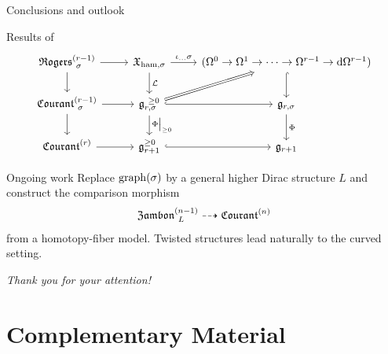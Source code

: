 \documentclass[handout,10pt]{beamer}
\begin{document}
	\addtocounter{framenumber}{-1}
		\begin{frame}{Conclusions and outlook}\label{frame:thankyouslide}
			\vfill
			\begin{block}{Results of \cite{Fiorenza2026}}
			\centering
				\begin{displaymath}
					\begin{tikzcd}[ampersand replacement=\&]
						\Rogers[\sigma]{r-1} \ar[d] \ar[r] \&
						\X_{\ham,\sigma} \ar[r,"\iota_{\dots}\sigma"] \ar[d,"\Lie"]\&
						(\Omega^0\to\Omega^1\to\cdots\to\Omega^{r-1}\to \d \Omega^{r-1}) \ar[d,hook] 
						\\
						\Courant[\sigma]{r-1} \ar[r] \ar[d]\&
						\g_{r,\sigma}^{~\geq 0} \ar[r,hook] \ar[ur,Rightarrow] \ar[d,"\Phi\big\vert_{\geq 0}"]\&
						\g_{r,\sigma} \ar[d,"\Phi"]
						\\
						\Courant{r} \ar[r] \&
						\g_{r+1}^{\geq 0} \ar[r,hook]\&
						\g_{r+1}
				\end{tikzcd}
			\end{displaymath}
			\end{block}
			\vfill\pause
			\begin{block}{Ongoing work}
			\centering
			Replace $\graph(\sigma)$ by a general higher Dirac structure $L$ and
			construct the comparison morphism
			\[
				\Zambon[L]{n-1}\dashrightarrow\Courant{n}
			\]
			from a homotopy-fiber model. Twisted structures lead naturally to the
			curved setting.
			\end{block}
			\vfill\pause
		  \centering
		  \Large\color{red}\emph{Thank you for your attention!}
		  \normalsize\color{black}
		\end{frame}
		\note[itemize]{
			\item
		}



\appendix
\section{Complementary Material}
	
	










\end{document}
